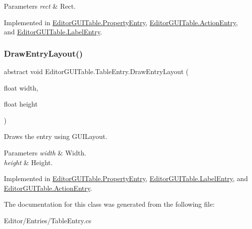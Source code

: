 \begin{DoxyParams}{Parameters}
{\em rect} & Rect.\\
\hline
\end{DoxyParams}


Implemented in \mbox{\hyperlink{class_editor_g_u_i_table_1_1_property_entry_a176094e41cb53be100106c1d58763607}{Editor\+G\+U\+I\+Table.\+Property\+Entry}}, \mbox{\hyperlink{class_editor_g_u_i_table_1_1_action_entry_a84dfbc114f27c8108899c3c25803ae60}{Editor\+G\+U\+I\+Table.\+Action\+Entry}}, and \mbox{\hyperlink{class_editor_g_u_i_table_1_1_label_entry_a94247717318efb4e51347519e0b985dc}{Editor\+G\+U\+I\+Table.\+Label\+Entry}}.

\mbox{\label{class_editor_g_u_i_table_1_1_table_entry_abe1e2747e56d50731eeec28635b366a1}} 
\subsubsection{\texorpdfstring{Draw\+Entry\+Layout()}{DrawEntryLayout()}}
{\footnotesize\ttfamily abstract void Editor\+G\+U\+I\+Table.\+Table\+Entry.\+Draw\+Entry\+Layout (\begin{DoxyParamCaption}\item[{float}]{width,  }\item[{float}]{height }\end{DoxyParamCaption})\hspace{0.3cm}{\ttfamily [pure virtual]}}



Draws the entry using G\+U\+I\+Layout. 


\begin{DoxyParams}{Parameters}
{\em width} & Width.\\
\hline
{\em height} & Height.\\
\hline
\end{DoxyParams}


Implemented in \mbox{\hyperlink{class_editor_g_u_i_table_1_1_property_entry_a5930e1e0e8cf4954cdbf25ef72e815f8}{Editor\+G\+U\+I\+Table.\+Property\+Entry}}, \mbox{\hyperlink{class_editor_g_u_i_table_1_1_label_entry_a1bf901bb1f193f4c7ff842d898968572}{Editor\+G\+U\+I\+Table.\+Label\+Entry}}, and \mbox{\hyperlink{class_editor_g_u_i_table_1_1_action_entry_ae556137b72e1e356a2e4cf4a12b88336}{Editor\+G\+U\+I\+Table.\+Action\+Entry}}.



The documentation for this class was generated from the following file\+:\begin{DoxyCompactItemize}
\item 
Editor/\+Entries/Table\+Entry.\+cs\end{DoxyCompactItemize}
